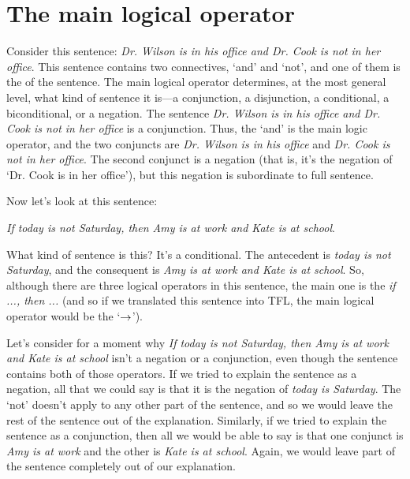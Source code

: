 \section{The main logical operator}
\label{main_logical_operator}

Consider this sentence: \textit{Dr. Wilson is in his  office and Dr. Cook is not in her office}. This sentence contains two connectives, `and' and `not', and one of them is the  of the sentence. The main logical operator determines, at the most general level, what kind of sentence it is---a conjunction, a disjunction, a conditional, a biconditional, or a negation. The sentence \textit{Dr. Wilson is in his  office and Dr. Cook is not in her office} is a conjunction. Thus, the `and' is the main logic operator, and the two conjuncts are \textit{Dr. Wilson is in his office} and \textit{Dr. Cook is not in her office}. The second conjunct is  a negation (that is, it's the negation of `Dr. Cook is in her office'), but this negation is subordinate to full sentence. 

Now let's look at this sentence: 
\begin{ebullet}
	\item[] \textit{If today is not Saturday, then Amy is at work and Kate is at school}. 
\end{ebullet}
	
\noindent What kind of sentence is this? It's a conditional. The antecedent is \textit{today is not Saturday}, and the consequent is \textit{Amy is at work and Kate is at school}. So, although there are three logical operators in this sentence, the main one is the \textit{if ..., then ...} (and so if we translated this sentence into TFL, the main logical operator would be the `$\rightarrow$'). 

Let's consider for a moment why \textit{If today is not Saturday, then Amy is at work and Kate is at school} isn't a negation or a conjunction, even though the sentence contains both of those operators. If we tried to explain the sentence as a negation, all that we could say is that it is the negation of \textit{today is Saturday}. The `not' doesn't apply to any other part of the sentence, and so we would leave the rest of the sentence out of the explanation. Similarly, if we tried to explain the sentence as a conjunction, then all we would be able to say is that one conjunct is \textit{Amy is at work} and the other is \textit{Kate is at school}. Again, we would leave part of the sentence completely out of our explanation. 

